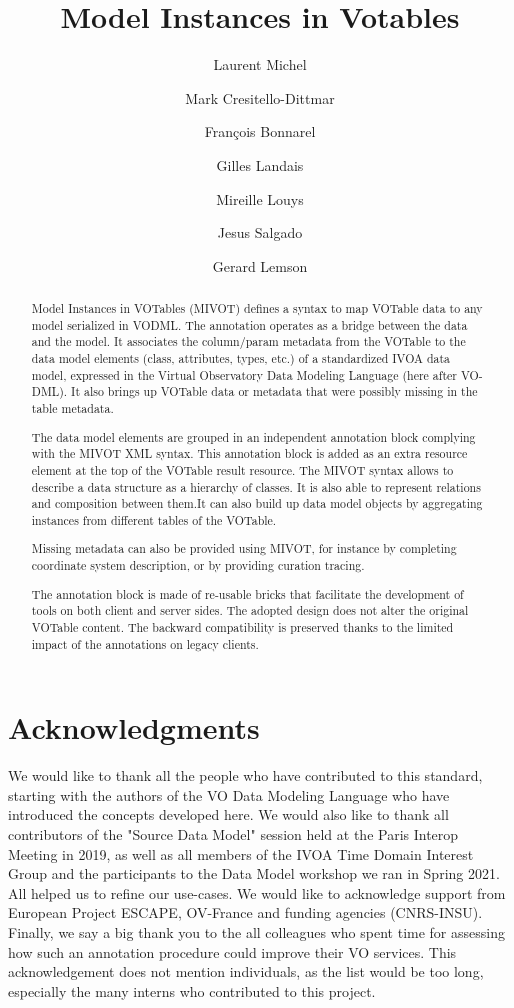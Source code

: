 \documentclass[11pt,a4paper]{ivoa}
\title{Model Instances in Votables}
\author{Laurent Michel}
\author{Mark Cresitello-Dittmar}
\author{François Bonnarel}
\author{Gilles Landais}
\author{Mireille Louys}
\author{Jesus Salgado}
\author{Gerard Lemson}
\begin{document}
\begin{abstract}
Model Instances in VOTables (MIVOT) defines a syntax to map VOTable data to any model serialized in VODML.
The annotation operates as a bridge between the data and the model.
It associates the column/param metadata from the VOTable to the 
data model elements (class, attributes, types, etc.) of a standardized IVOA data model, expressed in the Virtual Observatory Data Modeling Language (here after VO-DML).
It also brings up VOTable data or metadata that were possibly missing in the table metadata.

The data model elements are grouped in an independent annotation block complying with the MIVOT XML syntax.
This annotation block is added as an extra resource element at the top of the VOTable result resource. 
The MIVOT syntax allows to describe a data structure as a hierarchy of classes. It is also able to represent relations and composition between them.It can also build up data model objects by aggregating instances from different tables of the VOTable.

Missing metadata can also be provided using MIVOT, for instance by completing coordinate system description, or by providing curation tracing.

The annotation block is made of re-usable bricks that facilitate the development of tools on both client and server sides.
The adopted design does not alter the original VOTable content. 
The backward compatibility is preserved thanks to the limited impact of the annotations on legacy clients.
\end{abstract}


\section*{Acknowledgments}
We would like to thank all the people who have contributed to this standard, starting with the authors of the VO Data Modeling Language who have introduced the concepts developed here.
We would also like to thank all contributors of the "Source Data Model" session held at the Paris Interop Meeting in 2019, as well as all members of the IVOA Time Domain Interest Group and the participants to the Data Model workshop we ran in Spring 2021. All helped us to refine our use-cases.
We would like to acknowledge support from European Project ESCAPE, OV-France and funding agencies (CNRS-INSU).
Finally, we say a big thank you to the all colleagues who spent time for assessing how such an annotation procedure could improve their VO services.
This acknowledgement does not mention individuals, as the list would be too long, especially the many interns who contributed to this project.
\end{document}
